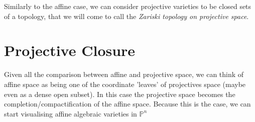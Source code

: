 \documentclass[12pt]{book}
\theoremstyle{definition}
\begin{document}
Similarly to the affine case, we can consider projective varieties to be closed sets of a topology, that we will come to call the \textit{Zariski topology on projective space}.

\section{Projective Closure}
Given all the comparison between affine and projective space, we can think of affine space as being one of the coordinate 'leaves' of projectives space (maybe even as a dense open subset). In this case the projective space becomes the completion/compactification of the affine space. Because this is the case, we can start visualising affine algebraic varieties in $\mathbb{P}^n$
\end{document}
